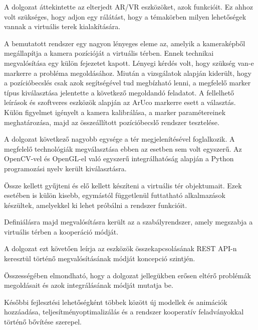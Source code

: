 
A dolgozat áttekintette az elterjedt AR/VR eszközöket, azok funkcióit. Ez ahhoz volt szükséges, hogy adjon egy rálátást, hogy a témakörben milyen lehetőségek vannak a virtuális terek kialakítására.

A bemutatott rendszer egy nagyon lényeges eleme az, amelyik a kameraképből megállapítja a kamera pozícióját a virtuális térben. Ennek technikai megvalósítása egy külön fejezetet kapott. Lényegi kérdés volt, hogy szükség van-e markerre a probléma megoldásához. Miután a vizsgálatok alapján kiderült, hogy a pozícióbecslés csak azok segítségével tud megbízható lenni, a megfelelő marker típus kiválasztása jelentette a következő megoldandó feladatot. A fellelhető leírások és szoftveres eszközök alapján az ArUco markerre esett a választás.
Külön figyelmet igényelt a kamera kalibrálása, a marker paramétereinek meghatározása, majd az összeállított pozícióbecslő rendszer tesztelése.

A dolgozat következő nagyobb egysége a tér megjelenítésével foglalkozik.
A megfelelő technológiák megválasztása ebben az esetben sem volt egyszerű.
Az OpenCV-vel és OpenGL-el való egyszerű integrálhatóság alapján a Python programozási nyelv került kiválasztásra.

Össze kellett gyűjteni és elő kellett készíteni a virtuális tér objektumait.
Ezek esetében is külön kisebb, egymástól függetlenül futtatható alkalmazások készültek, amelyekkel ki lehet próbálni a rendszer funkcióit.

Definiálásra majd megvalósításra került az a szabályrendszer, amely megszabja a virtuális térben a kooperáció módját.

A dolgozat ezt követően leírja az eszközök összekapcsolásának REST API-n keresztül történő megvalósításának módját koncepció szintjén.

Összességében elmondható, hogy a dolgozat jellegükben erősen eltérő problémák megoldásait és azok integrálásának módját mutatja be.

Későbbi fejlesztési lehetőségként többek között új modellek és animációk hozzáadása, teljesítményoptimalizálás és a rendszer kooperatív feladványokkal történő bővítése szerepel.
